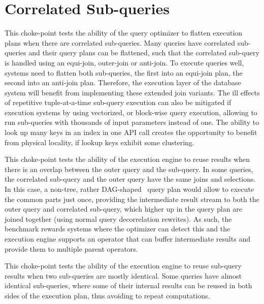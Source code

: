 \section{Correlated Sub-queries}


This choke-point tests the ability of the query optimizer to flatten execution plans when there are correlated sub-queries. Many queries have correlated sub-queries and their query plans can be flattened,
such that the correlated sub-query is handled using an equi-join, outer-join or anti-join. To execute queries well, systems need to flatten both sub-queries, the first into an equi-join plan, the second into an anti-join plan.
Therefore, the execution layer of the database system will benefit from implementing these extended join variants.
The ill effects of repetitive tuple-at-a-time sub-query execution can also be mitigated if execution systems by using vectorized, or block-wise query execution, allowing to run sub-queries with thousands of input parameters instead of one.
The ability to look up many keys in an index in one API call creates the opportunity to benefit from physical locality, if lookup keys exhibit some clustering.




This choke-point tests the ability of the execution engine to reuse results when there is an overlap between the outer query and the sub-query. In some queries, the correlated sub-query and the outer query have the same joins and selections.
In this case, a non-tree, rather DAG-shaped~\cite{DBLP:conf/btw/NeumannM09} query plan would allow to execute the common parts just once, providing the intermediate result stream to both the outer query and correlated sub-query,
which higher up in the query plan are joined together (using normal query decorrelation rewrites).
As such, the benchmark rewards systems where the optimizer can detect this and the execution engine supports an operator that can buffer intermediate results and provide them to multiple parent operators.




This choke-point tests the ability of the execution engine to reuse sub-query results when two sub-queries are mostly identical.
Some queries have almost identical sub-queries, where some of their internal results can be reused in both sides of the execution plan, thus avoiding to repeat computations.

